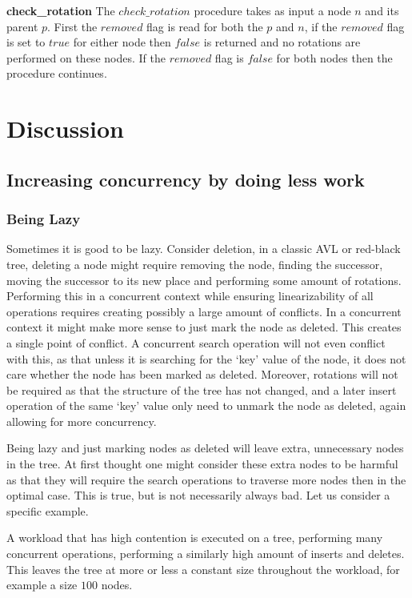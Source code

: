 \documentclass[10pt]{sigplanconf}
\begin{document}
{\bf check\_rotation} The $check\_rotation$ procedure takes as input a node $n$ and its parent $p$.
First the $removed$ flag is read for both the $p$ and $n$, if the $removed$ flag is set to $true$ for either node then $false$ is returned and no rotations are performed on these nodes.
If the $removed$ flag is $false$ for both nodes then the procedure continues.


\section{Discussion}

\subsection{Increasing concurrency by doing less work}
\subsubsection{Being Lazy}
Sometimes it is good to be lazy.
Consider deletion, in a classic AVL or red-black tree, deleting a node might require removing the node, finding the successor, moving the successor to its new place and performing
some amount of rotations.
Performing this in a concurrent context while ensuring linearizability of all operations requires creating possibly a large amount of conflicts.
In a concurrent context it might make more sense to just mark the node as deleted.
This creates a single point of conflict.
A concurrent search operation will not even conflict with this, as that unless it is searching for the `key' value of the node, it does not care whether
the node has been marked as deleted.
Moreover, rotations will not be required as that the structure of the tree has not changed, and a later insert operation of the same `key'
value only need to unmark the node as deleted, again allowing for more concurrency.

Being lazy and just marking nodes as deleted will leave extra, unnecessary nodes in the tree.
At first thought one might consider these extra nodes to be harmful as that they will require the search operations to traverse more nodes then in the optimal case.
This is true, but is not necessarily always bad.
Let us consider a specific example.

A workload that has high contention is executed on a tree, performing many concurrent operations, performing a similarly high amount of inserts and deletes.
This leaves the tree at more or less a constant size throughout the workload, for example a size $100$ nodes.
\end{document}
